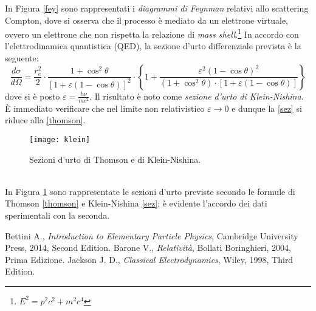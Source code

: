 \documentclass[a4paper, 12pt, oneside]{article}
\begin{document}
In Figura \ref{fey} sono rappresentati i \emph{diagrammi di Feynman} relativi allo scattering Compton, dove si osserva che il processo è mediato da un elettrone virtuale, ovvero un elettrone che non rispetta la relazione di \emph{mass shell}.\footnote{$E^2=p^2c^2+m^2c^4$} In accordo con l'elettrodinamica quantistica (QED), la sezione d'urto differenziale prevista è la seguente:
\begin{equation}\label{sez}
\frac{d\sigma}{d\Omega} = \frac{r_e^2}{2}\cdot\frac{1+\cos^2\theta}{\left[1+\varepsilon\left(1-\cos\theta\right)\right]^2}\cdot\left\{1+\frac{\varepsilon^2\left(1-\cos\theta\right)^2}{\left(1+\cos^2\theta\right)\cdot\left[1+\varepsilon\left(1-\cos\theta\right)\right]} \right\}
\end{equation}
dove si è posto $\varepsilon=\frac{h\nu}{mc^2}$. Il risultato è noto come \emph{sezione d'urto di Klein-Nishina}. \`E immediato verificare che nel limite non relativistico $\varepsilon\to 0$ e dunque la \eqref{sez} si riduce alla \eqref{thomson}.
\begin{figure}[!h]
	\centering
	\texttt{[image: klein]}
	\caption{Sezioni d'urto di Thomson e di Klein-Nishina.} \label{klein}
\end{figure}
\\In Figura \ref{klein} sono rappresentate le sezioni d'urto previste secondo le formule di Thomson \eqref{thomson} e Klein-Nishina \eqref{sez}; è evidente l'accordo dei dati sperimentali con la seconda.




		

\begin{thebibliography}{99}
	 Bettini A., \emph{Introduction to Elementary Particle Physics}, Cambridge University Press, 2014, Second Edition.
	 Barone V., \emph{Relatività}, Bollati Boringhieri, 2004, Prima Edizione.
	 Jackson J. D., \emph{Classical Electrodynamics}, Wiley, 1998, Third Edition.
\end{thebibliography}
\end{document}
